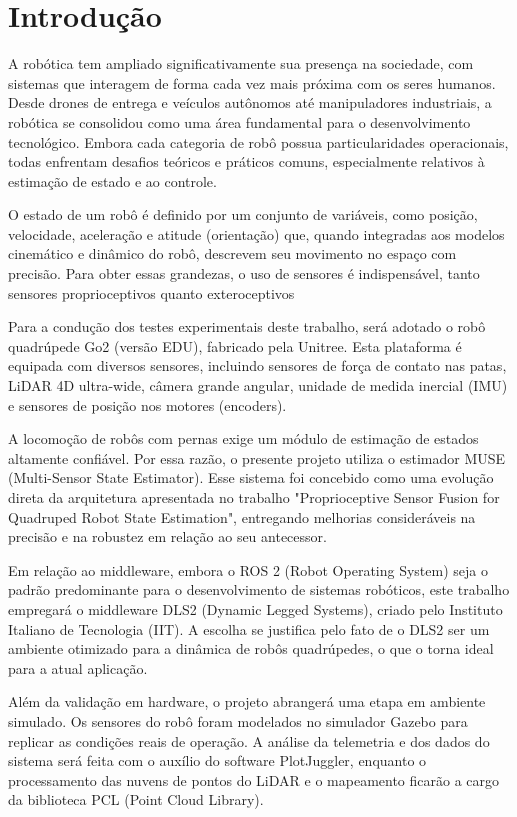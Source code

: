 \chapter{Introdução}
A robótica tem ampliado significativamente sua presença na sociedade, com 
sistemas que interagem de forma cada vez mais próxima com os seres humanos. 
Desde drones de entrega e veículos autônomos até manipuladores industriais,
 a robótica se consolidou como uma área fundamental para o desenvolvimento 
 tecnológico. Embora cada categoria de robô possua particularidades operacionais,
  todas enfrentam desafios teóricos e práticos comuns, especialmente relativos
   à estimação de estado e ao controle.

O estado de um robô é definido por um conjunto de variáveis, como posição, 
velocidade, aceleração e atitude (orientação) que, quando integradas aos
 modelos cinemático e dinâmico do robô, descrevem seu movimento no espaço com
  precisão. Para obter essas grandezas, o uso de sensores é indispensável, 
  tanto sensores proprioceptivos quanto exteroceptivos

Para a condução dos testes experimentais deste trabalho, será adotado o robô 
quadrúpede Go2 (versão EDU), fabricado pela Unitree. Esta plataforma é equipada 
com diversos sensores, incluindo sensores de força de contato nas patas, LiDAR 
4D ultra-wide, câmera grande angular, unidade de medida inercial (IMU) e sensores 
de posição nos motores (encoders).

A locomoção de robôs com pernas exige um módulo de estimação de estados
 altamente confiável. Por essa razão, o presente projeto utiliza o estimador 
 MUSE (Multi-Sensor State Estimator). Esse sistema foi concebido como uma 
 evolução direta da arquitetura apresentada no trabalho "Proprioceptive Sensor 
 Fusion for Quadruped Robot State Estimation", entregando melhorias consideráveis
  na precisão e na robustez em relação ao seu antecessor.

Em relação ao middleware, embora o ROS 2 (Robot Operating System) seja o padrão 
predominante para o desenvolvimento de sistemas robóticos, este trabalho empregará
 o middleware DLS2 (Dynamic Legged Systems), criado pelo Instituto Italiano de
  Tecnologia (IIT). A escolha se justifica pelo fato de o DLS2 ser um ambiente 
  otimizado para a dinâmica de robôs quadrúpedes, o que o torna ideal para a atual
   aplicação.

Além da validação em hardware, o projeto abrangerá uma etapa em ambiente 
simulado. Os sensores do robô foram modelados no simulador Gazebo para replicar 
as condições reais de operação. A análise da telemetria e dos dados do sistema 
será feita com o auxílio do software PlotJuggler, enquanto o processamento das 
nuvens de pontos do LiDAR e o mapeamento ficarão a cargo da biblioteca PCL 
(Point Cloud Library).

